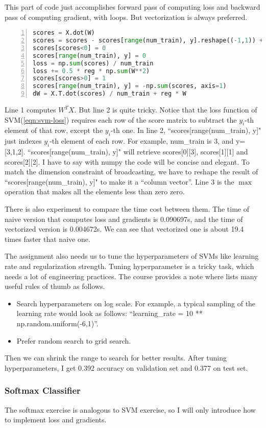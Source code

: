 \documentclass{article} %
\begin{document}
This part of code just accomplishes forward pass of computing loss and backward pass of computing gradient, with loops. But vectorization is always preferred.
\begin{lstlisting}[language=python,numbers=left]
scores = X.dot(W)
scores = scores - scores[range(num_train), y].reshape((-1,1)) + 1
scores[scores<0] = 0
scores[range(num_train), y] = 0
loss = np.sum(scores) / num_train
loss += 0.5 * reg * np.sum(W**2)
scores[scores>0] = 1
scores[range(num_train), y] = -np.sum(scores, axis=1)
dW = X.T.dot(scores) / num_train + reg * W
\end{lstlisting}
Line 1 computes $W^TX$. But line 2 is quite tricky. Notice that the loss function of SVM(\ref{eqn:svm-loss}) requires each row of the score matrix to subtract the $y_i$-th element of that row, except the $y_i$-th one. In line 2, ``scores[range(num\_train), y]" just indexes $y_i$-th element of each row. For example, num\_train is 3, and y=[3,1,2]. ``scores[range(num\_train), y]" will retrieve scores[0][3], scores[1][1] and scores[2][2]. I have to say with numpy the code will be concise and elegant. To match the dimension constraint of broadcasting, we have to reshape the result of ``scores[range(num\_train), y]" to make it a ``column vector''. Line 3 is the $\max$ operation that makes all the elements less than zero zero.

There is also experiment to compare the time cost between them. The time of naive version that computes loss and gradients is 0.090697s, and the time of vectorized version is 0.004672s. We can see that vectorized one is about 19.4 times faster that naive one.

The assignment also needs us to tune the hyperparameters of SVMs like learning rate and regularization strength. Tuning hyperparameter is a tricky task, which needs a lot of engineering practices. The course provides a note where lists many useful rules of thumb as follows.
\begin{itemize}
    \item Search hyperparameters on log scale. For example, a typical sampling of the learning rate would look as follows: ``learning\_rate = 10 ** np.random.uniform(-6,1)''.
    \item Prefer random search to grid search.
\end{itemize}
Then we can shrink the range to search for better results. After tuning hyperparameters, I get 0.392 accuracy on validation set and 0.377 on test set.

\subsubsection{Softmax Classifier}
The softmax exercise is analogous to SVM exercise, so I will only introduce how to implement loss and gradients.
\end{document}
